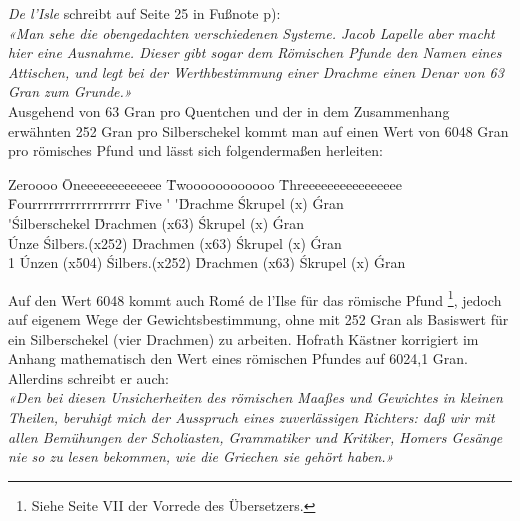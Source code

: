 \documentclass[a5paper,fontsize=10pt]{memoir}
\newcommand\gransofquentins{63}
\begin{document}
\emph{De l'Isle} schreibt auf Seite 25 in Fußnote p):\\

\emph{«Man sehe die obengedachten verschiedenen Systeme.
Jacob Lapelle aber macht hier eine Ausnahme.
Dieser gibt sogar dem Römischen Pfunde den Namen eines Attischen,
und legt bei der Werthbestimmung einer Drachme
einen Denar von 63 Gran zum Grunde.»}\\

Ausgehend von 63 Gran pro Quentchen
und der in dem Zusammenhang erwähnten 252 Gran pro Silberschekel
kommt man auf einen Wert von 6048 Gran pro römisches Pfund
und lässt sich folgendermaßen herleiten:\\

\noindent
\begin{minipage}{\linewidth}
\footnotesize
\FPeval{} %
\begin{tabbing}
Zeroooo  \= Oneeeeeeeeeeeee \= Twoooooooooooo    \= Threeeeeeeeeeeeeeee \= Fourrrrrrrrrrrrrrrrrr \= Five      \kill
         \>  \'             \>  \'               \'Drachme          \'Skrupel (x\scruplesofquentins)    \'Gran \\
         \>  \'             \'Silberschekel  \'Drachmen (x\gransofquentins)   \'Skrupel (x\scruplesofquentins)    \'Gran \\
         \'Unze         \'Silbers.(x252) \'Drachmen (x\gransofquentins)   \'Skrupel (x\scruplesofquentins)    \'Gran \\
1 \Pfund {}\'Unzen (x504) \'Silbers.(x252) \'Drachmen (x\gransofquentins)   \'Skrupel (x\scruplesofquentins)    \'Gran \\
\end{tabbing}
\end{minipage}

Auf den Wert 6048 kommt auch  Romé de l'Ilse
für das römische Pfund%
\footnote{Siehe Seite VII der Vorrede des Übersetzers.},
jedoch auf eigenem Wege der Gewichtsbestimmung,
ohne mit 252 Gran als Basiswert
für ein Silberschekel (vier Drachmen) zu arbeiten.
Hofrath Kästner korrigiert im Anhang mathematisch
den Wert eines römischen Pfundes auf 6024,1 Gran.
Allerdins schreibt er auch:\\

\emph{«Den bei diesen Unsicherheiten des römischen Maaßes
und Gewichtes in kleinen Theilen,
beruhigt mich der Ausspruch eines zuverlässigen Richters:
daß wir mit allen Bemühungen der Scholiasten, Grammatiker und Kritiker,
Homers Gesänge nie so zu lesen bekommen,
wie die Griechen sie gehört haben.»}\\
\end{document}
